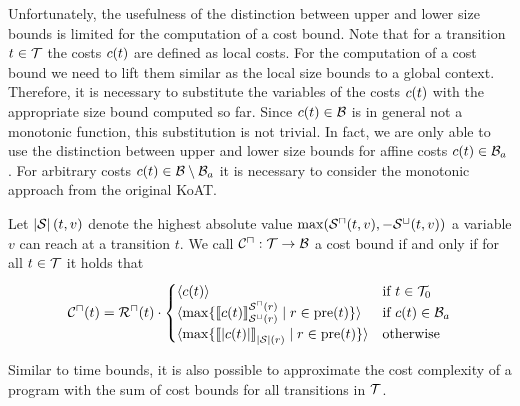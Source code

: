 Unfortunately, the usefulness of the distinction between upper and lower size bounds is limited for the computation of a cost bound.
Note that for a transition $t \in \mathcal{T}$ the costs $c(t)$ are defined as local costs.
For the computation of a cost bound we need to lift them similar as the local size bounds to a global context.
Therefore, it is necessary to substitute the variables of the costs $c(t)$ with the appropriate size bound computed so far.
Since $c(t) \in \mathcal{B}$ is in general not a monotonic function, this substitution is not trivial.
In fact, we are only able to use the distinction between upper and lower size bounds for affine costs $c(t) \in \mathcal{B}_a$.
For arbitrary costs $c(t) \in \mathcal{B} \setminus \mathcal{B}_a$ it is necessary to consider the monotonic approach from the original KoAT.

\begin{definition}
  Let $\left|\mathcal{S}\right|(t, v)$ denote the highest absolute value $\max({\mathcal{S}^\sqcap}(t, v), -{\mathcal{S}^\sqcup}(t, v))$ a variable $v$ can reach at a transition $t$.
  We call ${\mathcal{C}^\sqcap}: \mathcal{T} \rightarrow \mathcal{B}$ a cost bound if and only if for all $t \in \mathcal{T}$ it holds that
  \[ {\mathcal{C}^\sqcap}(t) = {\mathcal{R}^\sqcap}(t) \cdot
  \begin{cases}
    \langle c(t)\rangle & \text{if } t \in \mathcal{T}_0 \\
    \langle\max \lbrace \llbracket c(t) \rrbracket_{{\mathcal{S}^\sqcup}(r)}^{{\mathcal{S}^\sqcap}(r)} \mid r \in \text{pre}(t) \rbrace\rangle & \text{if } c(t) \in \mathcal{B}_a \\
    \langle\max \lbrace \llbracket \left|c(t)\right| \rrbracket_{\left|\mathcal{S}\right|(r)}^{} \mid r \in \text{pre}(t) \rbrace\rangle & \text{otherwise} \\
  \end{cases}
  \]
\end{definition}

Similar to time bounds, it is also possible to approximate the cost complexity of a program with the sum of cost bounds for all transitions in $\mathcal{T}$.


